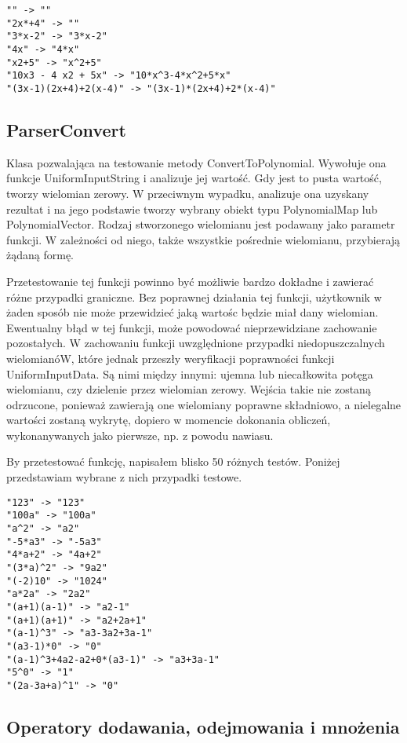 \documentclass[twoside,a4paper]{book}
\begin{document}
\begin{lstlisting}
"" -> ""
"2x*+4" -> ""
"3*x-2" -> "3*x-2"
"4x" -> "4*x"
"x2+5" -> "x^2+5"
"10x3 - 4 x2 + 5x" -> "10*x^3-4*x^2+5*x"
"(3x-1)(2x+4)+2(x-4)" -> "(3x-1)*(2x+4)+2*(x-4)"
\end{lstlisting}

\subsection{ParserConvert}

Klasa pozwalająca na testowanie metody ConvertToPolynomial. Wywołuje ona funkcje UniformInputString i analizuje jej wartość. Gdy jest to pusta wartość, tworzy wielomian zerowy. W przeciwnym wypadku, analizuje ona uzyskany rezultat i na jego podstawie tworzy wybrany obiekt typu PolynomialMap lub PolynomialVector. Rodzaj stworzonego wielomianu jest podawany jako parametr funkcji. W zależności od niego, także wszystkie pośrednie wielomianu, przybierają żądaną formę.

Przetestowanie tej funkcji powinno być możliwie bardzo dokładne i zawierać różne przypadki graniczne. Bez poprawnej działania tej funkcji, użytkownik w żaden sposób nie może przewidzieć jaką wartośc będzie miał dany wielomian. Ewentualny błąd w tej funkcji, może powodować nieprzewidziane zachowanie pozostałych. W zachowaniu funkcji uwzględnione przypadki niedopuszczalnych wielomianóW, które jednak przeszły weryfikacji poprawności funkcji UniformInputData. Są nimi między innymi: ujemna lub niecałkowita potęga wielomianu, czy dzielenie przez wielomian zerowy. Wejścia takie nie zostaną odrzucone, ponieważ zawierają one wielomiany poprawne składniowo, a nielegalne wartości zostaną wykrytę, dopiero w momencie dokonania obliczeń, wykonanywanych jako pierwsze, np. z powodu nawiasu.

By przetestować funkcję, napisałem blisko 50 różnych testów. Poniżej przedstawiam wybrane z nich przypadki testowe.

\begin{lstlisting}
"123" -> "123"
"100a" -> "100a"
"a^2" -> "a2"
"-5*a3" -> "-5a3"
"4*a+2" -> "4a+2"
"(3*a)^2" -> "9a2"
"(-2)10" -> "1024"
"a*2a" -> "2a2"
"(a+1)(a-1)" -> "a2-1"
"(a+1)(a+1)" -> "a2+2a+1"
"(a-1)^3" -> "a3-3a2+3a-1"
"(a3-1)*0" -> "0"
"(a-1)^3+4a2-a2+0*(a3-1)" -> "a3+3a-1"
"5^0" -> "1"
"(2a-3a+a)^1" -> "0"
\end{lstlisting}

\subsection{Operatory dodawania, odejmowania i mnożenia}
\end{document}
